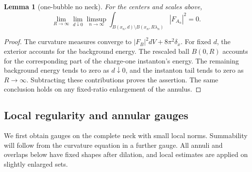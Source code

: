\documentclass[11pt]{amsart}
\newtheorem{lemma}[theorem]{Lemma}
\theoremstyle{definition}
\theoremstyle{remark}
\theoremstyle{plain}
\begin{document}
\begin{lemma}[one-bubble no neck]\label{lem:no-neck}
For the centers and scales above,
\begin{equation}\label{eq:no-neck-energy}
 \lim_{R\to\infty}\lim_{d\downarrow0}\limsup_{n\to\infty}
 \int_{B(x_n,d)\setminus B(x_n,R\lambda_n)}|F_{A_n}|^2=0.
\end{equation}
\end{lemma}
\begin{proof}
The curvature measures converge to
$|F_B|^2dV+8\pi^2\delta_x$.  For fixed $d$, the exterior accounts
for the background energy.  The rescaled ball $B(0,R)$ accounts for
the corresponding part of the charge-one instanton's energy.
The remaining background energy tends to zero as $d\downarrow0$,
and the instanton tail tends to zero as $R\to\infty$.  Subtracting
these contributions proves the assertion.  The same conclusion holds
on any fixed-ratio enlargement of the annulus.
\end{proof}

\subsection{Local regularity and annular gauges}
We first obtain gauges on the complete neck with small local norms.
Summability will follow from the curvature equation in a further gauge.
All annuli and overlaps below have fixed shapes after dilation, and
local estimates are applied on slightly enlarged sets.
\end{document}
